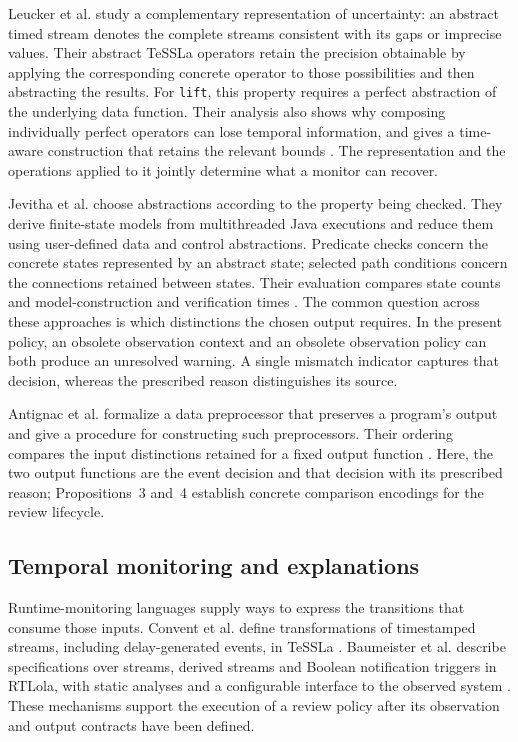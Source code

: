 \documentclass[preprint,11pt]{elsarticle}
\newcommand{\code}[1]{\texttt{#1}}
\begin{document}
Leucker et al. study a complementary representation of uncertainty: an abstract timed stream denotes the complete streams consistent with its gaps or imprecise values. Their abstract TeSSLa operators retain the precision obtainable by applying the corresponding concrete operator to those possibilities and then abstracting the results. For \code{lift}, this property requires a perfect abstraction of the underlying data function. Their analysis also shows why composing individually perfect operators can lose temporal information, and gives a time-aware construction that retains the relevant bounds \cite{leucker2019partial}. The representation and the operations applied to it jointly determine what a monitor can recover.

Jevitha et al. choose abstractions according to the property being checked. They derive finite-state models from multithreaded Java executions and reduce them using user-defined data and control abstractions. Predicate checks concern the concrete states represented by an abstract state; selected path conditions concern the connections retained between states. Their evaluation compares state counts and model-construction and verification times \cite{jevitha2024abstract}. The common question across these approaches is which distinctions the chosen output requires. In the present policy, an obsolete observation context and an obsolete observation policy can both produce an unresolved warning. A single mismatch indicator captures that decision, whereas the prescribed reason distinguishes its source.

Antignac et al. formalize a data preprocessor that preserves a program's output and give a procedure for constructing such preprocessors. Their ordering compares the input distinctions retained for a fixed output function \cite{antignac2017minimisation}. Here, the two output functions are the event decision and that decision with its prescribed reason; Propositions~3 and~4 establish concrete comparison encodings for the review lifecycle.

\subsection{Temporal monitoring and explanations}
Runtime-monitoring languages supply ways to express the transitions that consume those inputs. Convent et al. define transformations of timestamped streams, including delay-generated events, in TeSSLa \cite{convent2018tessla}. Baumeister et al. describe specifications over streams, derived streams and Boolean notification triggers in RTLola, with static analyses and a configurable interface to the observed system \cite{baumeister2026rtlola}. These mechanisms support the execution of a review policy after its observation and output contracts have been defined.
\end{document}
